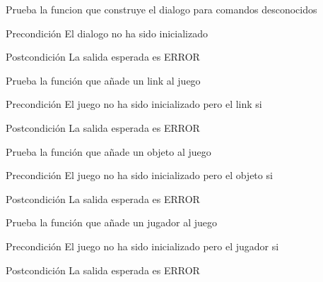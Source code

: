 \begin{DoxyRefList}
\item[\label{test__test000027}%
\hypertarget{test__test000027}{}%
Global \hyperlink{dialogue__test_8c_a23f24fdcb26f4125edef54917fb3f062}{test2\-\_\-dialogue\-\_\-unknown} ()]Prueba la funcion que construye el dialogo para comandos desconocidos \begin{DoxyPrecond}{Precondición}
El dialogo no ha sido inicializado 
\end{DoxyPrecond}
\begin{DoxyPostcond}{Postcondición}
La salida esperada es E\-R\-R\-O\-R  
\end{DoxyPostcond}

\item[\label{test__test000075}%
\hypertarget{test__test000075}{}%
Global \hyperlink{game__test_8c_af5c4dd79b2a7b67adbeeb8df5791a5de}{test2\-\_\-game\-\_\-add\-\_\-link} ()]Prueba la función que añade un link al juego \begin{DoxyPrecond}{Precondición}
El juego no ha sido inicializado pero el link si 
\end{DoxyPrecond}
\begin{DoxyPostcond}{Postcondición}
La salida esperada es E\-R\-R\-O\-R  
\end{DoxyPostcond}

\item[\label{test__test000069}%
\hypertarget{test__test000069}{}%
Global \hyperlink{game__test_8c_ab996895e69c5d41fab5515e88aed3975}{test2\-\_\-game\-\_\-add\-\_\-object} ()]Prueba la función que añade un objeto al juego \begin{DoxyPrecond}{Precondición}
El juego no ha sido inicializado pero el objeto si 
\end{DoxyPrecond}
\begin{DoxyPostcond}{Postcondición}
La salida esperada es E\-R\-R\-O\-R  
\end{DoxyPostcond}

\item[\label{test__test000078}%
\hypertarget{test__test000078}{}%
Global \hyperlink{game__test_8c_a42bb53c500bf8ae4dce0e144a85cd80b}{test2\-\_\-game\-\_\-add\-\_\-player} ()]Prueba la función que añade un jugador al juego \begin{DoxyPrecond}{Precondición}
El juego no ha sido inicializado pero el jugador si 
\end{DoxyPrecond}
\begin{DoxyPostcond}{Postcondición}
La salida esperada es E\-R\-R\-O\-R  
\end{DoxyPostcond}


\end{DoxyRefList}
